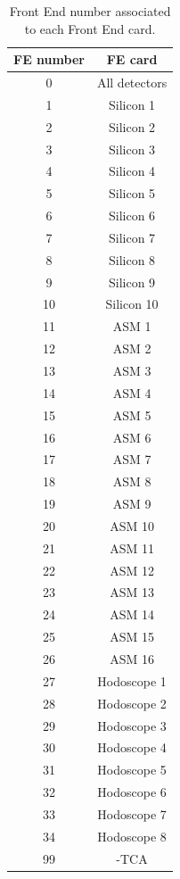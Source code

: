 \begin{table} [!htbp]
\centering
\caption{Front End number associated to each Front End card.}
\label{table::FE_numbers}
\begin{tabular}{cc}
\hline
\rowcolor{Gray}
\textbf{FE number} & \textbf{FE card} \\
\hline
\hline
0			&	All detectors \\
\hline
1			 &     Silicon 1\\
2			&	Silicon 2	\\
3        		&	Silicon 3	\\
4			&	Silicon 4	\\
5			 &     Silicon 5\\
6			&	Silicon 6	\\
7        		&	Silicon 7	\\
8			&	Silicon 8	\\
9        		&	Silicon 9	\\
10			&	Silicon 10\\
\hline
11			&	ASM 1\\
12			&	ASM 2\\
13			&	ASM 3\\
14			&	ASM 4\\
15			&	ASM 5\\
16			&	ASM 6\\
17			&	ASM 7\\
18			&	ASM 8\\
19			&	ASM 9\\
20			&	ASM 10\\
21			&	ASM 11\\
22			&	ASM 12\\
23			&	ASM 13\\
24			&	ASM 14\\
25			&	ASM 15\\
26			&	ASM 16\\
\hline
27			 &     Hodoscope 1\\
28			&	Hodoscope 2	\\
29        		&	Hodoscope 3	\\
30			&	Hodoscope 4	\\
31			 &     Hodoscope 5\\
32			&	Hodoscope 6	\\
33        		&	Hodoscope 7	\\
34			&	Hodoscope 8	\\
\hline
99 			&  \charmu-TCA\\
\hline
\end{tabular}
\end{table}


